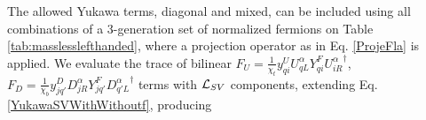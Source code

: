 \documentclass[12pt]{article}
\renewcommand\[{\begin{dmath}}
\renewcommand\]{\end{dmath}}
\begin{document}




The  allowed Yukawa terms, diagonal and mixed, can be included using all combinations of  a 3-generation  set of  normalized fermions on Table \ref{tab:masslesslefthanded}, where a projection operator as in Eq. \ref{ProjeFla} is  applied.
       We evaluate the trace of bilinear
  $F_U=\frac{1}{\chi_t} y^U_{qi}  U^\alpha_{qL}  Y^F_{qi}  {  U_{iR}^\alpha}^\dagger$,
 $F_D=\frac{1}{\chi_b} y^D_{jq'}  D^\alpha_{jR}  Y^F_{jq'}   { D_{q'L}^\alpha}^\dagger$
  terms with ${\cal L}_{SV}$ components,   extending Eq. \ref{YukawaSVWithWithoutf},  producing
\end{document}
